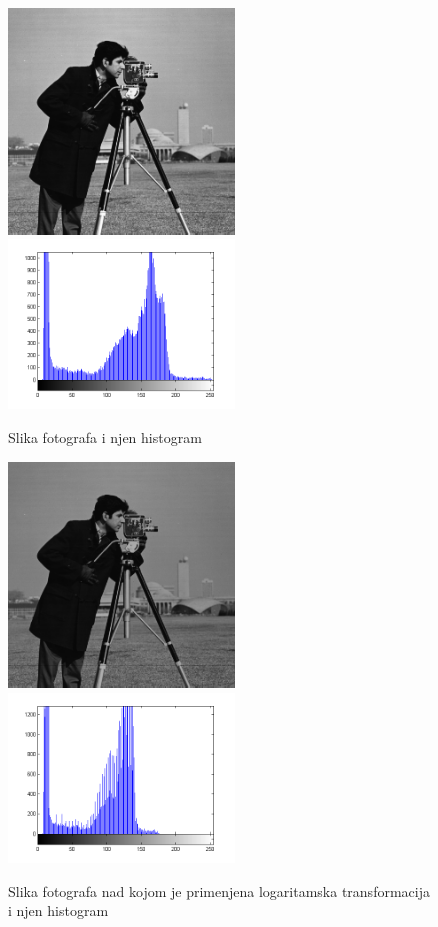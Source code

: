 \documentclass[a4paper,12pt,titlepage]{article}
\begin{document}
\begin{figure}[ht!]
\centering
\includegraphics[width=60mm]{img/img.png}
\includegraphics[width=60mm]{img/histImg.png}
\caption{Slika fotografa i njen histogram}
\label{hist1}
\end{figure} 

\begin{figure}[ht!]
\centering
\includegraphics[width=60mm]{img/imgLog.png}
\includegraphics[width=60mm]{img/histImgLog.png}
\caption{Slika fotografa nad kojom je primenjena logaritamska transformacija i njen histogram}
\label{hist2}
\end{figure} 
\end{document}

